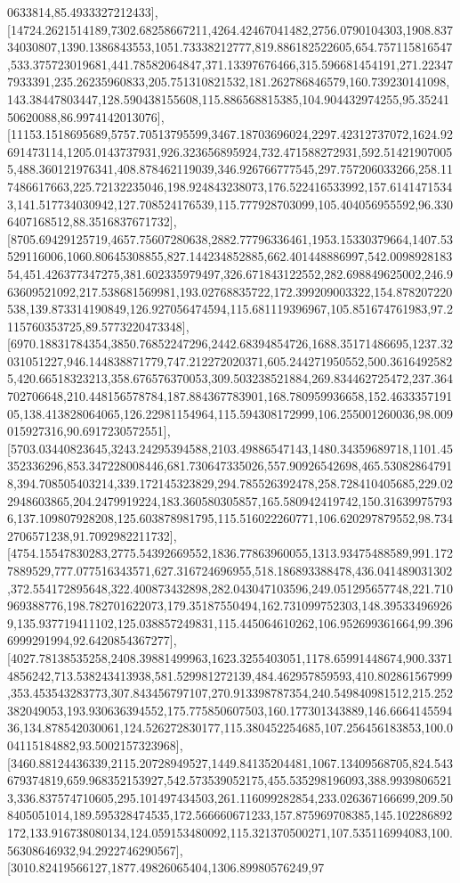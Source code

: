 \documentclass{article}
\begin{document}
0633814,85.4933327212433],[14724.2621514189,7302.68258667211,4264.42467041482,2756.0790104303,1908.83734030807,1390.1386843553,1051.73338212777,819.886182522605,654.757115816547,533.375723019681,441.78582064847,371.13397676466,315.596681454191,271.223477933391,235.26235960833,205.751310821532,181.262786846579,160.739230141098,143.38447803447,128.590438155608,115.886568815385,104.904432974255,95.3524150620088,86.9974142013076],[11153.1518695689,5757.70513795599,3467.18703696024,2297.42312737072,1624.92691473114,1205.0143737931,926.323656895924,732.471588272931,592.514219070055,488.360121976341,408.878462119039,346.926766777545,297.757206033266,258.117486617663,225.72132235046,198.924843238073,176.522416533992,157.61414715343,141.517734030942,127.708524176539,115.777928703099,105.404056955592,96.3306407168512,88.3516837671732],[8705.69429125719,4657.75607280638,2882.77796336461,1953.15330379664,1407.53529116006,1060.80645308855,827.144234852885,662.401448886997,542.009892818354,451.426377347275,381.602335979497,326.671843122552,282.698849625002,246.963609521092,217.538681569981,193.02768835722,172.399209003322,154.878207220538,139.873314190849,126.927056474594,115.681119396967,105.851674761983,97.2115760353725,89.5773220473348],[6970.18831784354,3850.76852247296,2442.68394854726,1688.35171486695,1237.32031051227,946.144838871779,747.212272020371,605.244271950552,500.36164925825,420.66518323213,358.676576370053,309.503238521884,269.834462725472,237.364702706648,210.448156578784,187.884367783901,168.780959936658,152.463335719105,138.413828064065,126.22981154964,115.594308172999,106.255001260036,98.009015927316,90.6917230572551],[5703.03440823645,3243.24295394588,2103.49886547143,1480.34359689718,1101.45352336296,853.347228008446,681.730647335026,557.90926542698,465.530828647918,394.708505403214,339.172145323829,294.785526392478,258.728410405685,229.022948603865,204.2479919224,183.360580305857,165.580942419742,150.316399757936,137.109807928208,125.603878981795,115.516022260771,106.620297879552,98.7342706571238,91.7092982211732],[4754.15547830283,2775.54392669552,1836.77863960055,1313.93475488589,991.1727889529,777.077516343571,627.316724696955,518.186893388478,436.041489031302,372.554172895648,322.400873432898,282.043047103596,249.051295657748,221.710969388776,198.782701622073,179.35187550494,162.731099752303,148.395334969269,135.937719411102,125.038857249831,115.445064610262,106.952699361664,99.3966999291994,92.6420854367277],[4027.78138535258,2408.39881499963,1623.3255403051,1178.65991448674,900.33714856242,713.538243413938,581.529981272139,484.462957859593,410.802861567999,353.453543283773,307.843456797107,270.913398787354,240.549840981512,215.252382049053,193.930636394552,175.775850607503,160.177301343889,146.666414559436,134.878542030061,124.526272830177,115.380452254685,107.256456183853,100.004115184882,93.5002157323968],[3460.88124436339,2115.20728949527,1449.84135204481,1067.13409568705,824.543679374819,659.968352153927,542.573539052175,455.535298196093,388.99398065213,336.837574710605,295.101497434503,261.116099282854,233.026367166699,209.508405051014,189.595328474535,172.566660671233,157.875969708385,145.102286892172,133.916738080134,124.059153480092,115.321370500271,107.535116994083,100.56308646932,94.2922746290567],[3010.82419566127,1877.49826065404,1306.89980576249,97
\end{document}
